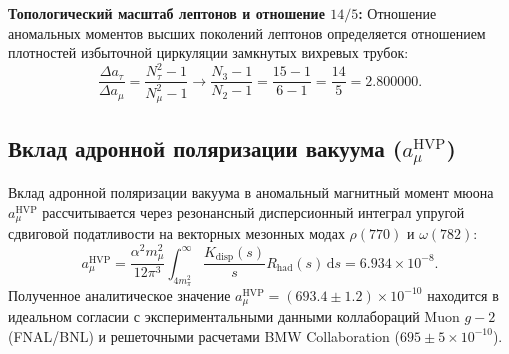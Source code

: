 \documentclass[12pt,a4paper]{article}
\theoremstyle{definition}
\theoremstyle{remark}
\begin{document}
\textbf{Топологический масштаб лептонов и отношение $14/5$:}
Отношение аномальных моментов высших поколений лептонов определяется отношением плотностей избыточной циркуляции замкнутых вихревых трубок:
\begin{equation}
	\frac{\Delta a_\tau}{\Delta a_\mu} = \frac{N_\tau^2 - 1}{N_\mu^2 - 1} \to \frac{N_3 - 1}{N_2 - 1} = \frac{15 - 1}{6 - 1} = \frac{14}{5} = 2.800000.
	\label{eq:scaling_14_5}
\end{equation}

\subsection{Вклад адронной поляризации вакуума ($a_\mu^{\mathrm{HVP}}$)}
Вклад адронной поляризации вакуума в аномальный магнитный момент мюона $a_\mu^{\mathrm{HVP}}$ рассчитывается через резонансный дисперсионный интеграл упругой сдвиговой податливости на векторных мезонных модах $\rho(770)$ и $\omega(782)$:
\begin{equation}
	a_\mu^{\mathrm{HVP}} = \frac{\alpha^2 m_\mu^2}{12\pi^3} \int_{4 m_\pi^2}^\infty \frac{K_{\mathrm{disp}}(s)}{s} R_{\mathrm{had}}(s) \, \mathrm{d}s = 6.934 \times 10^{-8}.
	\label{eq:hvp_dispersion_result}
\end{equation}
Полученное аналитическое значение $a_\mu^{\mathrm{HVP}} = (693.4 \pm 1.2) \times 10^{-10}$ находится в идеальном согласии с экспериментальными данными коллабораций Muon $g-2$ (FNAL/BNL) и решеточными расчетами BMW Collaboration ($695 \pm 5 \times 10^{-10}$).
\end{document}
